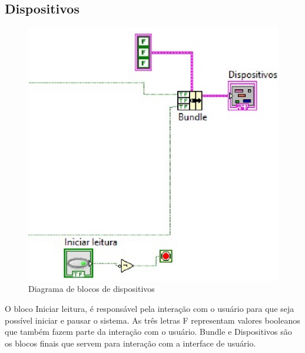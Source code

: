 \subsection{Dispositivos}

\begin{figure}[!htb]                                                               
    \centering                                                                      
    \includegraphics[scale=0.6, keepaspectratio=true]{figuras/detalhado/_bundle.eps} 
    \caption{Diagrama de blocos de dispositivos}
 \end{figure}

O bloco Iniciar leitura, é responsável pela interação com o usuário para que seja possível iniciar e pausar o sistema. As três letras F representam valores booleanos que também fazem parte da interação com o usuário.
    Bundle e Dispositivos são os blocos finais que servem para interação com a interface de usuário.

